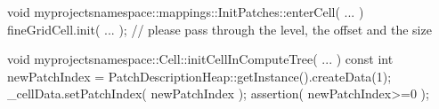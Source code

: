 \begin{code}
void myprojectsnamespace::mappings::InitPatches::enterCell(
  ...
) {
  fineGridCell.init( ... ); // please pass through the level, the offset and the size
}


void myprojectsnamespace::Cell::initCellInComputeTree( ... ) {
  const int newPatchIndex = PatchDescriptionHeap::getInstance().createData(1);
  _cellData.setPatchIndex( newPatchIndex );
  assertion( newPatchIndex>=0 );
}

\end{code}
